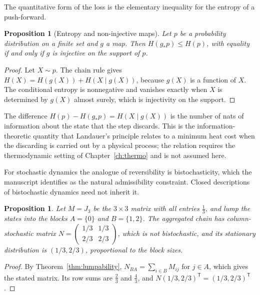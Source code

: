 \documentclass[11pt,oneside]{book}
\newtheorem{proposition}[theorem]{Proposition}
\theoremstyle{definition}
\theoremstyle{remark}
\begin{document}
The quantitative form of the loss is the elementary inequality for the entropy of a push-forward.

\begin{proposition}[Entropy and non-injective maps]\label{prop:pushforward}
Let $p$ be a probability distribution on a finite set and $g$ a map. Then $H(g_*p)\leq H(p)$, with equality if and only if $g$ is injective on the support of $p$.
\end{proposition}

\begin{proof}
Let $X\sim p$. The chain rule gives $H(X)=H(g(X))+H(X\mid g(X))$, because $g(X)$ is a function of $X$. The conditional entropy is nonnegative and vanishes exactly when $X$ is determined by $g(X)$ almost surely, which is injectivity on the support.
\end{proof}

The difference $H(p)-H(g_*p)=H(X\mid g(X))$ is the number of nats of information about the state that the step discards. This is the information-theoretic quantity that Landauer's principle \cite{landauer1961} relates to a minimum heat cost when the discarding is carried out by a physical process; the relation requires the thermodynamic setting of Chapter~\ref{ch:thermo} and is not assumed here.

For stochastic dynamics the analogue of reversibility is bistochasticity, which the manuscript identifies as the natural admissibility constraint. Closed descriptions of bistochastic dynamics need not inherit it.

\begin{proposition}\label{prop:lumped-nonbistochastic}
Let $M=J_3$ be the $3\times3$ matrix with all entries $\tfrac13$, and lump the states into the blocks $A=\{0\}$ and $B=\{1,2\}$. The aggregated chain has column-stochastic matrix $N=\begin{pmatrix}1/3&1/3\\2/3&2/3\end{pmatrix}$, which is not bistochastic, and its stationary distribution is $(1/3,2/3)$, proportional to the block sizes.
\end{proposition}

\begin{proof}
By Theorem~\ref{thm:lumpability}, $N_{BA}=\sum_{i\in B}M_{ij}$ for $j\in A$, which gives the stated matrix. Its row sums are $\tfrac23$ and $\tfrac43$, and $N(1/3,2/3)^{\mathsf T}=(1/3,2/3)^{\mathsf T}$.
\end{proof}
\end{document}
